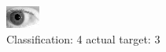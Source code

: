 \begin{figure}[h!]
\begin{center}
\includegraphics[width=0.60\columnwidth]{figures/ID262_class_4_target_3.png}
\end{center}
\caption{ Classification: 4 actual target: 3}
\label{fig:ID262_class_4_target_3}
\end{figure}
